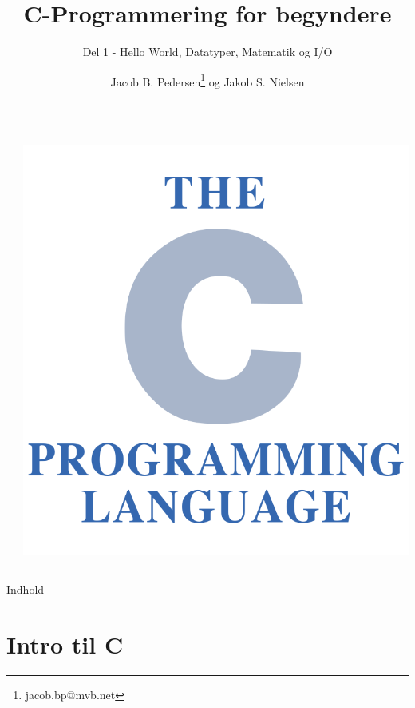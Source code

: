 \documentclass{beamer}
\title{C-Programmering for begyndere}
\subtitle{Del 1 - Hello World, Datatyper, Matematik og I/O}
\author{Jacob B. Pedersen\footnote{jacob.bp@mvb.net} og Jakob S. Nielsen}
\begin{document}
\begin{frame}
	\begin{columns}
		\begin{column}
			\maketitle
		\end{column}
		\begin{column}
			\includegraphics{assets/The_C_Programming_Language_logo.png}
		\end{column}
	\end{columns}
\end{frame}

\begin{frame}{Indhold}
  \tableofcontents
\end{frame}

\section{Intro til C}
\end{document}
